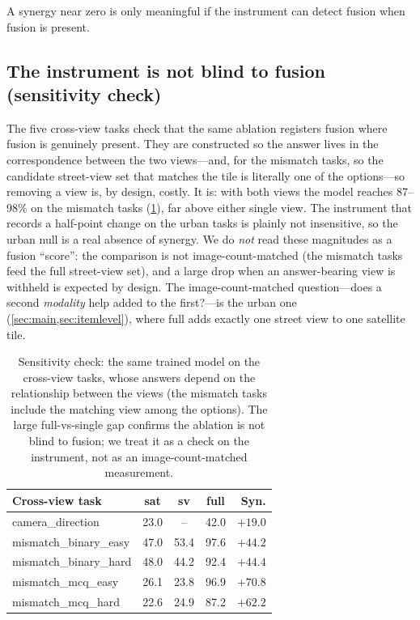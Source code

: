 A synergy near zero is only meaningful if the instrument can detect fusion when
fusion is present.

\subsection{The instrument is not blind to fusion (sensitivity check)}
\label{sec:control}

The five cross-view tasks check that the same ablation registers fusion where fusion
is genuinely present. They are constructed so the answer lives in the correspondence
between the two views---and, for the mismatch tasks, so the candidate street-view set
that matches the tile is literally one of the options---so removing a view is, by
design, costly. It is: with both views the model reaches \num{87}--\num{98}\% on the
mismatch tasks (\cref{tab:control}), far above either single view. The instrument that
records a half-point change on the urban tasks is plainly not insensitive, so the
urban null is a real absence of synergy. We do \emph{not} read these magnitudes as a
fusion ``score'': the comparison is not image-count-matched (the mismatch tasks feed
the full street-view set), and a large drop when an answer-bearing view is withheld is
expected by design. The image-count-matched question---does a second \emph{modality}
help added to the first?---is the urban one (\cref{sec:main,sec:itemlevel}), where
\textsf{full} adds exactly one street view to one satellite tile.

\begin{table}[t]
  \centering
  \caption{Sensitivity check: the same trained model on the cross-view tasks, whose
  answers depend on the relationship between the views (the mismatch tasks include the
  matching view among the options). The large \textsf{full}-vs-single gap confirms the
  ablation is not blind to fusion; we treat it as a check on the instrument, not as an
  image-count-matched measurement.}
  \label{tab:control}
  \setlength{\tabcolsep}{6pt}
  \begin{tabular}{@{}lcccr@{}}
    \toprule
    Cross-view task & sat & sv & full & Syn. \\
    \midrule
    camera\_direction      & 23.0 & --   & 42.0 & $+19.0$ \\
    mismatch\_binary\_easy & 47.0 & 53.4 & 97.6 & $+44.2$ \\
    mismatch\_binary\_hard & 48.0 & 44.2 & 92.4 & $+44.4$ \\
    mismatch\_mcq\_easy    & 26.1 & 23.8 & 96.9 & $+70.8$ \\
    mismatch\_mcq\_hard    & 22.6 & 24.9 & 87.2 & $+62.2$ \\
    \bottomrule
  \end{tabular}
\end{table}

